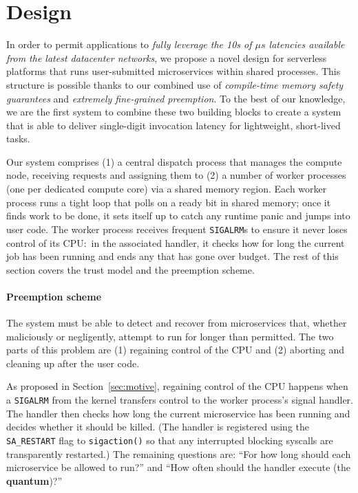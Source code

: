 \section{Design}
\label{sec:design}


In order to permit applications to \textit{fully leverage the 10s of $\mu{}s$
latencies available from the latest datacenter networks}, we propose a novel design
for serverless platforms that runs user-submitted microservices within shared
processes.  This structure is possible thanks to our combined use of
\textit{compile-time memory safety guarantees} and \textit{extremely fine-grained
preemption}.  To the best of our knowledge, we are the first system to combine these
two building blocks to create a system that is able to deliver single-digit
invocation latency for lightweight, short-lived tasks.


Our system comprises (1) a central dispatch process that manages the compute node,
receiving requests and assigning them to (2) a number of worker processes (one per
dedicated compute core) via a shared memory region.  Each worker process runs a
tight loop that polls on a ready bit in shared memory; once it finds work to be done,
it sets itself up to catch any runtime panic and jumps into user code.  The worker
process receives frequent \texttt{SIGALRM}s to ensure it never loses control of its
CPU:\ in the associated handler, it checks how for long the current job has been
running and ends any that has gone over budget.  The rest of this section covers the
trust model and the preemption scheme.


\paragraph{Preemption scheme}
The system must be able to detect and recover from microservices that, whether
maliciously or negligently, attempt to run for longer than permitted.  The two parts
of this problem are (1) regaining control of the CPU and (2) aborting and cleaning up
after the user code.

As proposed in Section~\ref{sec:motive}, regaining control of the CPU happens when a
\texttt{SIGALRM} from the kernel transfers control to the worker process's signal
handler.  The handler then checks how long the current microservice has been running
and decides whether it should be killed.  (The handler is registered using the
\texttt{SA\_RESTART} flag to \texttt{sigaction()} so that any interrupted blocking
syscalls are transparently restarted.)  The remaining questions are:  ``For how
long should each microservice be allowed to run?'' and ``How often should the handler
execute (the \textbf{quantum})?''

